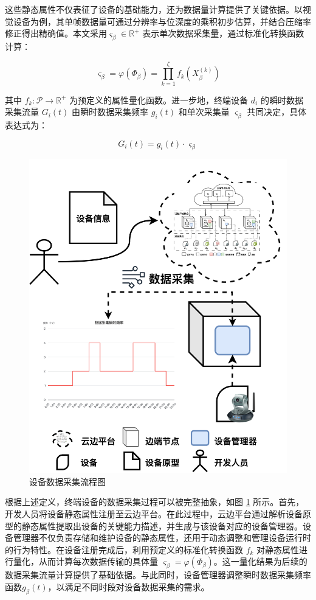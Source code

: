 这些静态属性不仅表征了设备的基础能力，还为数据量计算提供了关键依据。以视觉设备为例，其单帧数据量可通过分辨率与位深度的乘积初步估算，并结合压缩率修正得出精确值。本文采用$\varsigma_\beta \in \mathbb{R}^+$ 表示单次数据采集量，通过标准化转换函数计算：

\begin{equation}
\varsigma_\beta = \varphi(\Phi_\beta) = \prod_{k=1}^{\zeta} f_k(X^{(k)}_\beta)
\end{equation}

其中 $f_k: \mathcal{P} \to \mathbb{R}^+$ 为预定义的属性量化函数。进一步地，终端设备 $d_i$ 的瞬时数据采集流量 $G_i(t)$ 由瞬时数据采集频率 $g_i(t)$ 和单次采集量 $\varsigma_\beta$ 共同决定，具体表达式为：

\begin{equation}
G_i(t) = g_i(t) \cdot \varsigma_\beta
\end{equation}

\begin{figure}[h]
  \centering
  \includegraphics[width=0.55\linewidth]{pics/3-3设备模型.png}
  \caption{设备数据采集流程图}
  \label{fig:3-3device}
\end{figure}

根据上述定义，终端设备的数据采集过程可以被完整抽象，如图 \ref{fig:3-3device} 所示。首先，开发人员将设备静态属性注册至云边平台。在此过程中，云边平台通过解析设备原型的静态属性提取出设备的关键能力描述，并生成与该设备对应的设备管理器。设备管理器不仅负责存储和维护设备的静态属性，还用于动态调整和管理设备运行时的行为特性。在设备注册完成后，利用预定义的标准化转换函数 $f_k$ 对静态属性进行量化，从而计算每次数据传输的具体量 $\varsigma_\beta = \varphi(\Phi_\beta)$。这一量化结果为后续的数据采集流量计算提供了基础依据。与此同时，设备管理器调整瞬时数据采集频率函数$g_\beta(t)$，以满足不同时段对设备数据采集的需求。

